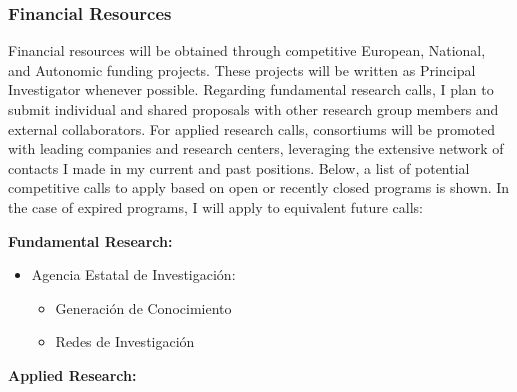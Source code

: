 \documentclass{article}
\begin{document}
\subsubsection{Financial Resources}

Financial resources will be obtained through competitive European, National, and Autonomic funding projects. These projects will be written as Principal Investigator whenever possible. Regarding fundamental research calls, I plan to submit individual and shared proposals with other research group members and external collaborators. For applied research calls, consortiums will be promoted with leading companies and research centers, leveraging the extensive network of contacts I made in my current and past positions. Below, a list of potential competitive calls to apply based on open or recently closed programs is shown. In the case of expired programs, I will apply to equivalent future calls:

{\bf Fundamental Research:}

\begin{itemize}[noitemsep]
\item Agencia Estatal de Investigación: 
\begin{itemize}[noitemsep]
\item[·] Generación de Conocimiento
\item[·] Redes de Investigación
\end{itemize}
\end{itemize}


{\bf Applied Research:}
\end{document}
